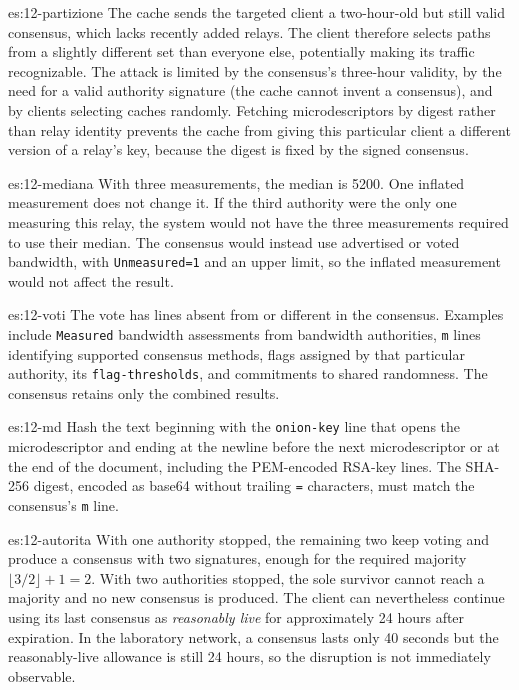 \begin{soluzione}{es:12-partizione}
The cache sends the targeted client a two-hour-old but still valid consensus, which lacks recently added relays. The client therefore selects paths from a slightly different set than everyone else, potentially making its traffic recognizable. The attack is limited by the consensus's three-hour validity, by the need for a valid authority signature (the cache cannot invent a consensus), and by clients selecting caches randomly. Fetching microdescriptors by digest rather than relay identity prevents the cache from giving this particular client a different version of a relay's key, because the digest is fixed by the signed consensus.
\end{soluzione}

\begin{soluzione}{es:12-mediana}
With three measurements, the median is 5200. One inflated measurement does not change it. If the third authority were the only one measuring this relay, the system would not have the three measurements required to use their median. The consensus would instead use advertised or voted bandwidth, with \texttt{Unmeasured=1} and an upper limit, so the inflated measurement would not affect the result.
\end{soluzione}

\begin{soluzione}{es:12-voti}
The vote has lines absent from or different in the consensus. Examples include \texttt{Measured} bandwidth assessments from bandwidth authorities, \texttt{m} lines identifying supported consensus methods, flags assigned by that particular authority, its \texttt{flag-thresholds}, and commitments to shared randomness. The consensus retains only the combined results.
\end{soluzione}

\begin{soluzione}{es:12-md}
Hash the text beginning with the \texttt{onion-key} line that opens the microdescriptor and ending at the newline before the next microdescriptor or at the end of the document, including the PEM-encoded RSA-key lines. The SHA-256 digest, encoded as base64 without trailing \texttt{=} characters, must match the consensus's \texttt{m} line.
\end{soluzione}

\begin{soluzione}{es:12-autorita}
With one authority stopped, the remaining two keep voting and produce a consensus with two signatures, enough for the required majority $\lfloor 3/2 \rfloor + 1 = 2$. With two authorities stopped, the sole survivor cannot reach a majority and no new consensus is produced. The client can nevertheless continue using its last consensus as \emph{reasonably live} for approximately 24 hours after expiration. In the laboratory network, a consensus lasts only 40 seconds but the reasonably-live allowance is still 24 hours, so the disruption is not immediately observable.
\end{soluzione}

